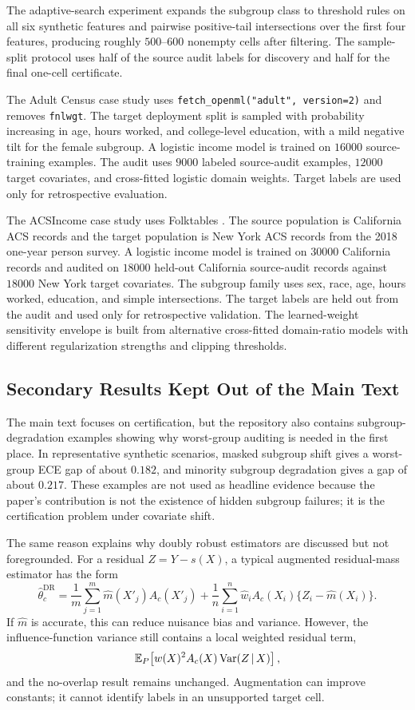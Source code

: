 The adaptive-search experiment expands the subgroup class to threshold rules on all six synthetic features and pairwise positive-tail intersections over the first four features, producing roughly \(500\)--\(600\) nonempty cells after filtering. The sample-split protocol uses half of the source audit labels for discovery and half for the final one-cell certificate.

The Adult Census case study uses \texttt{fetch\_openml("adult", version=2)} and removes \texttt{fnlwgt}. The target deployment split is sampled with probability increasing in age, hours worked, and college-level education, with a mild negative tilt for the female subgroup. A logistic income model is trained on \(16000\) source-training examples. The audit uses \(9000\) labeled source-audit examples, \(12000\) target covariates, and cross-fitted logistic domain weights. Target labels are used only for retrospective evaluation.

The ACSIncome case study uses Folktables \citep{Ding2021RetiringAdult}. The source population is California ACS records and the target population is New York ACS records from the 2018 one-year person survey. A logistic income model is trained on \(30000\) California records and audited on \(18000\) held-out California source-audit records against \(18000\) New York target covariates. The subgroup family uses sex, race, age, hours worked, education, and simple intersections. The target labels are held out from the audit and used only for retrospective validation. The learned-weight sensitivity envelope is built from alternative cross-fitted domain-ratio models with different regularization strengths and clipping thresholds.

\subsection{Secondary Results Kept Out of the Main Text}

The main text focuses on certification, but the repository also contains subgroup-degradation examples showing why worst-group auditing is needed in the first place. In representative synthetic scenarios, masked subgroup shift gives a worst-group ECE gap of about \(0.182\), and minority subgroup degradation gives a gap of about \(0.217\). These examples are not used as headline evidence because the paper's contribution is not the existence of hidden subgroup failures; it is the certification problem under covariate shift.

The same reason explains why doubly robust estimators are discussed but not foregrounded. For a residual \(Z=Y-s(X)\), a typical augmented residual-mass estimator has the form
\[
\widehat\theta_c^{\mathrm{DR}}
=
\frac1m\sum_{j=1}^{m}\widehat m(X'_j)A_c(X'_j)
+
\frac1n\sum_{i=1}^{n}\widehat w_iA_c(X_i)
\{Z_i-\widehat m(X_i)\}.
\]
If \(\widehat m\) is accurate, this can reduce nuisance bias and variance. However, the influence-function variance still contains a local weighted residual term,
\[
\mathbb{E}_P\!\left[
w(X)^2A_c(X)\operatorname{Var}(Z\,|\, X)
\right],
\]
and the no-overlap result remains unchanged. Augmentation can improve constants; it cannot identify labels in an unsupported target cell.

